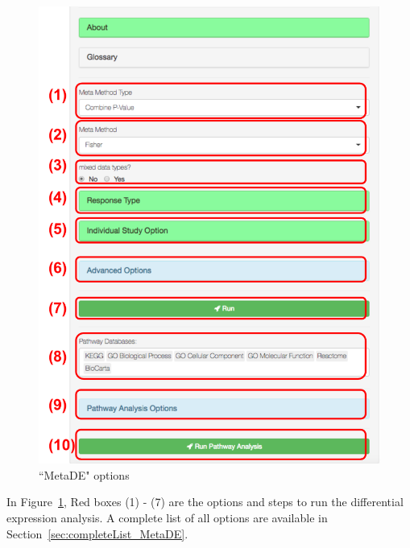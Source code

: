 \begin{figure}[H]
\begin{center}
\includegraphics[scale=0.6]{./figure/metaDE/metaDEoption.pdf}
\caption{``MetaDE" options}
\label{fig:MetaDEoption}
\end{center}
\end{figure}

In Figure~\ref{fig:MetaDEoption},
{\color{red} Red boxes (1) - (7)} are the options and steps to run the differential expression analysis.
A complete list of all options are available in Section~\ref{sec:completeList_MetaDE}. 

